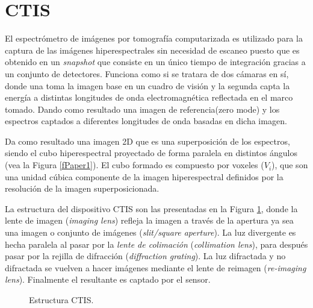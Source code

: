 \section{CTIS}
\label{CTIS}
El espectrómetro de imágenes por tomografía computarizada es utilizado para la captura de las imágenes hiperespectrales sin necesidad de escaneo puesto que es obtenido en un \textit{snapshot} que consiste en un único tiempo de integración gracias a un conjunto de detectores. 
Funciona como si se tratara de dos cámaras en sí, donde una toma la imagen base en un cuadro de visión y la segunda capta la energía a distintas longitudes de onda electromagnética reflectada en el marco tomado.
Dando como resultado una imagen de referencia(zero mode) y los espectros captados a diferentes longitudes de onda basadas en dicha imagen.

Da como resultado una imagen 2D que es una superposición de los espectros, siendo el cubo hiperespectral proyectado de forma paralela en distintos ángulos (vea la Figura \ref{fPaper1}). El cubo formado es compuesto por voxeles ($V_i$), que son una unidad cúbica componente de la imagen hiperespectral definidos por la resolución de la imagen superposicionada.   

La estructura del dispositivo CTIS son las presentadas en la Figura \ref{fCTIS}, donde la lente de imagen (\textit{imaging lens}) refleja la imagen a través de la apertura ya sea una imagen o conjunto de imágenes (\textit{slit/square aperture}). La luz divergente es hecha paralela al pasar por la \textit{lente de colimación} (\textit{collimation lens}), para después pasar por la rejilla de difracción (\textit{diffraction grating}). La luz difractada y no difractada se vuelven a hacer imágenes mediante el lente de reimagen (\textit{re-imaging lens}). Finalmente el resultante es captado por el sensor.

\begin{figure}[h]
  \centering
  \centering
  \caption{Estructura CTIS. \cite{PracCam}}
  \label{fCTIS}
\end{figure}

